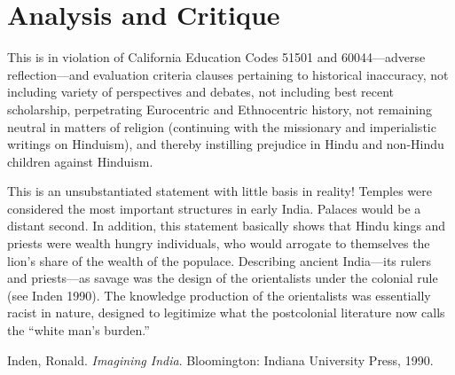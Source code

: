 \section*{Analysis and Critique} 

This is in violation of California Education Codes 51501 and 60044—adverse reflection—and evaluation criteria clauses pertaining to historical inaccuracy, not including variety of perspectives and debates, not including best recent scholarship, perpetrating Eurocentric and Ethnocentric history, not remaining neutral in matters of religion (continuing with the missionary and imperialistic writings on Hinduism), and thereby instilling prejudice in Hindu and non-Hindu children against Hinduism. 

This is an unsubstantiated statement with little basis in reality! Temples were considered the most important structures in early India. Palaces would be a distant second. In addition, this statement basically shows that Hindu kings and priests were wealth hungry individuals, who would arrogate to themselves the lion’s share of the wealth of the populace. Describing ancient India—its rulers and priests—as savage was the design of the orientalists under the colonial rule (see Inden 1990). The knowledge production of the orientalists was essentially racist in nature, designed to legitimize what the postcolonial literature now calls the “white man’s burden.” 

\begin{thebibliography}{99}
 Inden, Ronald. \textit{Imagining India}. Bloomington: Indiana University Press, 1990.
\end{thebibliography}
